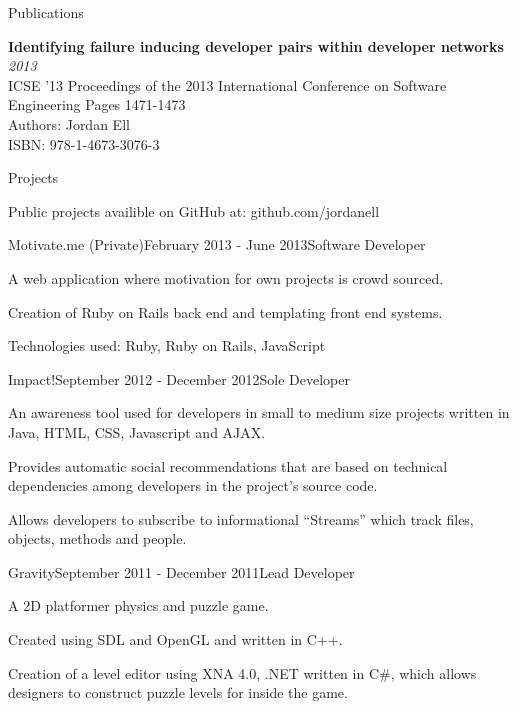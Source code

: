 \documentclass{resume} %
\begin{document}

\begin{rSection}{Publications}

{\bf Identifying failure inducing developer pairs within developer networks} \hfill {\em2013} \\ 
ICSE '13 Proceedings of the 2013 International Conference on Software Engineering Pages 1471-1473 \\
Authors: Jordan Ell \\
ISBN: 978-1-4673-3076-3

\end{rSection}


\begin{rSection}{Projects}

Public projects availible on GitHub at: github.com/jordanell

\begin{rSubsection}{Motivate.me (Private)}{February 2013 - June 2013}{Software Developer}{}
\item A web application where motivation for own projects is crowd sourced.
\item Creation of Ruby on Rails back end and templating front end systems. 
\item Technologies used: Ruby, Ruby on Rails, JavaScript
\end{rSubsection}

\begin{rSubsection}{Impact!}{September 2012 - December 2012}{Sole Developer}{}
\item An awareness tool used for developers in small to medium size projects written in Java, HTML, CSS, Javascript and AJAX.
\item Provides automatic social recommendations that are based on technical dependencies among developers in the project's source code.
\item Allows developers to subscribe to informational ``Streams'' which track files, objects, methods and people.
\end{rSubsection}

\begin{rSubsection}{Gravity}{September 2011 - December 2011}{Lead Developer}{}
\item A 2D platformer physics and puzzle game.
\item Created using SDL and OpenGL and written in C++. 
\item Creation of a level editor using XNA 4.0, .NET written in C\#, which allows designers to construct puzzle levels for inside the game.
\end{rSubsection}

\end{rSection}
\end{document}
